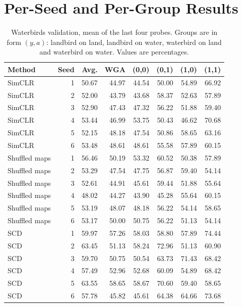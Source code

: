 \documentclass{article}
\begin{document}
\section{Per-Seed and Per-Group Results}
\label{app:seedresults}
\begin{table}[htbp]
\centering\small
\setlength{\tabcolsep}{4pt}
\caption{Waterbirds validation, mean of the last four probes. Groups are in form $(y,a)$: landbird on land, landbird on water, waterbird on land and waterbird on water. Values are percentages.}
\begin{tabular}{lrrrrrrr}
\toprule
Method & Seed & Avg. & WGA & (0,0) & (0,1) & (1,0) & (1,1) \\
\midrule
SimCLR & 1 & 50.67 & 44.97 & 44.54 & 50.00 & 54.89 & 66.92 \\
SimCLR & 2 & 52.00 & 43.79 & 43.68 & 58.37 & 52.63 & 57.89 \\
SimCLR & 3 & 52.90 & 47.43 & 47.32 & 56.22 & 51.88 & 59.40 \\
SimCLR & 4 & 53.44 & 46.99 & 53.75 & 50.43 & 46.62 & 70.68 \\
SimCLR & 5 & 52.15 & 48.18 & 47.54 & 50.86 & 58.65 & 63.16 \\
SimCLR & 6 & 53.48 & 48.61 & 48.61 & 55.58 & 57.89 & 60.15 \\
\addlinespace
Shuffled maps & 1 & 56.46 & 50.19 & 53.32 & 60.52 & 50.38 & 57.89 \\
Shuffled maps & 2 & 53.29 & 47.54 & 47.75 & 56.87 & 59.40 & 54.14 \\
Shuffled maps & 3 & 52.61 & 44.91 & 45.61 & 59.44 & 51.88 & 55.64 \\
Shuffled maps & 4 & 48.02 & 44.27 & 43.90 & 45.28 & 55.64 & 60.15 \\
Shuffled maps & 5 & 53.19 & 48.07 & 48.18 & 56.22 & 54.14 & 58.65 \\
Shuffled maps & 6 & 53.17 & 50.00 & 50.75 & 56.22 & 51.13 & 54.14 \\
\addlinespace
SCD & 1 & 59.97 & 57.26 & 58.03 & 58.80 & 57.89 & 74.44 \\
SCD & 2 & 63.45 & 51.13 & 58.24 & 72.96 & 51.13 & 60.90 \\
SCD & 3 & 59.70 & 50.75 & 50.54 & 63.73 & 71.43 & 68.42 \\
SCD & 4 & 57.49 & 52.96 & 52.68 & 60.09 & 54.89 & 68.42 \\
SCD & 5 & 63.55 & 58.65 & 58.67 & 70.60 & 59.40 & 58.65 \\
SCD & 6 & 57.78 & 45.82 & 45.61 & 64.38 & 64.66 & 73.68 \\
\bottomrule
\end{tabular}
\end{table}
\end{document}
